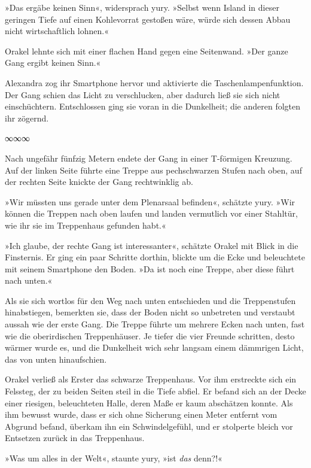 »Das ergäbe keinen Sinn«, widersprach yury. »Selbst wenn Island in dieser geringen Tiefe auf einen Kohlevorrat gestoßen wäre, würde sich dessen Abbau nicht wirtschaftlich lohnen.«

Orakel lehnte sich mit einer flachen Hand gegen eine Seitenwand. »Der ganze Gang ergibt keinen Sinn.«

Alexandra zog ihr Smartphone hervor und aktivierte die Taschenlampenfunktion. Der Gang schien das Licht zu verschlucken, aber dadurch ließ sie sich nicht einschüchtern. Entschlossen ging sie voran in die Dunkelheit; die anderen folgten ihr zögernd.

\begin{center}
∞∞∞
\end{center}

Nach ungefähr fünfzig Metern endete der Gang in einer T-förmigen Kreuzung. Auf der linken Seite führte eine Treppe aus pechschwarzen Stufen nach oben, auf der rechten Seite knickte der Gang rechtwinklig ab.

»Wir müssten uns gerade unter dem Plenarsaal befinden«, schätzte yury. »Wir können die Treppen nach oben laufen und landen vermutlich vor einer Stahltür, wie ihr sie im Treppenhaus gefunden habt.«

»Ich glaube, der rechte Gang ist interessanter«, schätzte Orakel mit Blick in die Finsternis. Er ging ein paar Schritte dorthin, blickte um die Ecke und beleuchtete mit seinem Smartphone den Boden. »Da ist noch eine Treppe, aber diese führt nach unten.«

Als sie sich wortlos für den Weg nach unten entschieden und die Treppenstufen hinabstiegen, bemerkten sie, dass der Boden nicht so unbetreten und verstaubt aussah wie der erste Gang. Die Treppe führte um mehrere Ecken nach unten, fast wie die oberirdischen Treppenhäuser. Je tiefer die vier Freunde schritten, desto wärmer wurde es, und die Dunkelheit wich sehr langsam einem dämmrigen Licht, das von unten hinaufschien.

Orakel verließ als Erster das schwarze Treppenhaus. Vor ihm erstreckte sich ein Felssteg, der zu beiden Seiten steil in die Tiefe abfiel. Er befand sich an der Decke einer riesigen, beleuchteten Halle, deren Maße er kaum abschätzen konnte. Als ihm bewusst wurde, dass er sich ohne Sicherung einen Meter entfernt vom Abgrund befand, überkam ihn ein Schwindelgefühl, und er stolperte bleich vor Entsetzen zurück in das Treppenhaus.

»Was um alles in der Welt«, staunte yury, »ist \emph{das} denn?!«

